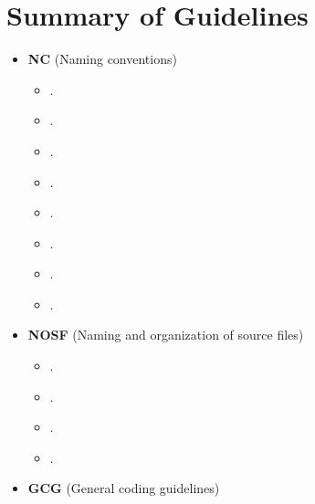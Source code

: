 %
\section{Summary of Guidelines}
\label{sec:summary_guidelines}
%

\begin{itemize}

\item\textbf{NC} (Naming conventions)

  \setcounter{Thyra_NC_counter}{0}

  \begin{itemize}
  {}\item\NCClassNames.
  {}\item\NCNamespaceNames.
  {}\item\NCEnumNames.
  {}\item\NCObjectNames.
  {}\item\NCDataMemberNames.
  {}\item\NCFunctionNames.
  {}\item\NCBaseDefaultClassNames.
  {}\item\NCConstNonconstAccessFunctionName.
  \end{itemize}

\item\textbf{NOSF} (Naming and organization of source files)

  \setcounter{Thyra_NOSF_counter}{0}

  \begin{itemize}
  {}\item\NOSFFileExtension.
  {}\item\NOSFClassFiles.
  {}\item\NOSFIncludeGuards.
  {}\item\NOSFTemplateFiles.
  \end{itemize}

\item\textbf{GCG} (General coding guidelines)

  \setcounter{Thyra_GCG_counter}{0}


\end{itemize}
